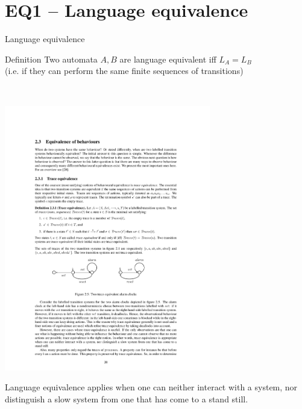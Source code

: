 \documentclass[aspectratio=169]{beamer}
\begin{document}




\section{EQ1 -- Language equivalence}

\begin{slide}{Language  equivalence}
\small

\begin{block}{Definition}
Two automata $A, B$ are \alert{language equivalent} iff  $ L_A =  L_B$\\
(i.e. if they can perform the same finite sequences of transitions)
\end{block}
~\\

\begin{example}
  \centering
  \includegraphics[width=9cm]{./images/alarm3.pdf}
\end{example}


\alert{Language equivalence} applies  when one can neither interact with a system, nor distinguish a slow system from one that has come to a stand still.
\end{slide}
\end{document}
